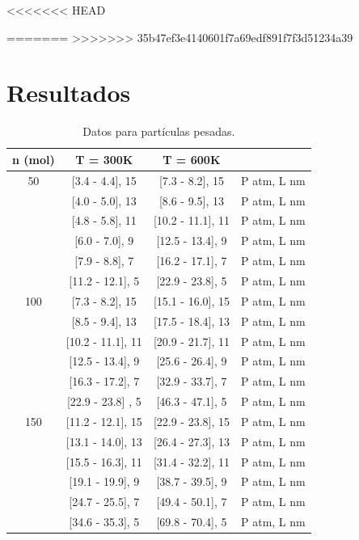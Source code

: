 \documentclass[]{article}
\begin{document}
<<<<<<< HEAD








=======
>>>>>>> 35b47ef3e4140601f7a69edf891f7f3d51234a39
\section{Resultados}



\begin{table}[h]
 \centering
 \begin{tabular}{|c|c|c|l|} \hline
  n (mol)&  T = 300K        &    T = 600K    &        \\ \hline
   50    & [3.4 - 4.4], 15 & [7.3 - 8.2], 15& P atm, L nm\\ 
         & [4.0 - 5.0], 13 & [8.6 - 9.5], 13& P atm, L nm\\
         & [4.8 - 5.8], 11 & [10.2 - 11.1], 11& P atm, L nm\\ 
         & [6.0 - 7.0],  9 & [12.5 - 13.4],  9& P atm, L nm\\ 
         & [7.9 - 8.8],  7 & [16.2 - 17.1],  7& P atm, L nm\\  
         & [11.2 - 12.1], 5 & [22.9 - 23.8],  5& P atm, L nm\\ \hline
   100   & [7.3 - 8.2], 15 & [15.1 - 16.0], 15& P atm, L nm\\ 
         & [8.5 - 9.4], 13 & [17.5 - 18.4], 13& P atm, L nm\\
         & [10.2 - 11.1], 11 & [20.9 - 21.7], 11& P atm, L nm\\ 
         & [12.5 - 13.4], 9 & [25.6 - 26.4],  9& P atm, L nm\\ 
         & [16.3 - 17.2], 7 & [32.9 - 33.7],  7& P atm, L nm\\  
         & [22.9 - 23.8] , 5 & [46.3 - 47.1],  5& P atm, L nm\\ \hline
   150   & [11.2 - 12.1], 15 & [22.9 - 23.8], 15& P atm, L nm\\ 
         & [13.1 - 14.0], 13 & [26.4 - 27.3], 13& P atm, L nm\\
         & [15.5 - 16.3], 11 & [31.4 - 32.2], 11& P atm, L nm\\ 
         & [19.1 - 19.9],  9 & [38.7 - 39.5],  9& P atm, L nm\\ 
         & [24.7 - 25.5],  7 & [49.4 - 50.1],  7& P atm, L nm\\  
         & [34.6 - 35.3],  5 & [69.8 - 70.4],  5& P atm, L nm\\ \hline

   

\end{tabular}
\caption{\label{tab:Pesadas} Datos para partículas pesadas.}
\end{table}
\end{document}
